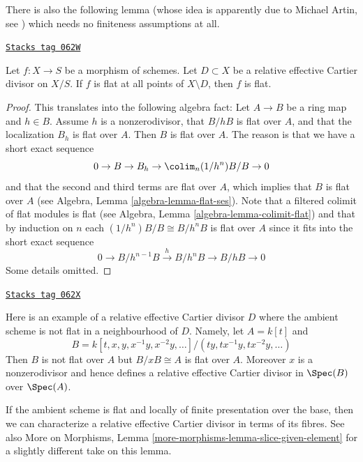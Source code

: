 There is also the following lemma (whose idea is apparently
due to Michael Artin, see \cite{Nobile}) which needs no finiteness
assumptions at all.

\begin{lemma}
\label{divisors-lemma-michael-artin}
\href{https://stacks.math.columbia.edu/tag/062W}{\texttt{Stacks tag 062W}}

Let $f : X \to S$ be a morphism of schemes.
Let $D \subset X$ be a relative effective Cartier divisor on $X/S$.
If $f$ is flat at all points of $X \setminus D$, then $f$ is flat.
\end{lemma}

\begin{proof}
This translates into the following algebra fact:
Let $A \to B$ be a ring map and $h \in B$.
Assume $h$ is a nonzerodivisor, that $B/hB$ is flat over $A$, and
that the localization $B_h$ is flat over $A$. Then $B$ is flat over $A$.
The reason is that we have a short exact sequence
$$
0 \to B \to B_h \to \colim_n (1/h^n)B/B \to 0
$$
and that the second and third terms are flat over $A$, which implies
that $B$ is flat over $A$ (see
Algebra, Lemma \ref{algebra-lemma-flat-ses}). Note that a filtered
colimit of flat modules is flat (see
Algebra, Lemma \ref{algebra-lemma-colimit-flat})
and that by induction on $n$ each $(1/h^n)B/B \cong B/h^nB$ is flat over
$A$ since it fits into the short exact sequence
$$
0 \to B/h^{n - 1}B \xrightarrow{h} B/h^nB \to B/hB \to 0
$$
Some details omitted.
\end{proof}

\begin{example}
\label{divisors-example-relative-cartier-ambient-space-not-flat}
\href{https://stacks.math.columbia.edu/tag/062X}{\texttt{Stacks tag 062X}}

Here is an example of a relative effective Cartier divisor $D$ where the
ambient scheme is not flat in a neighbourhood of $D$. Namely, let
$A = k[t]$ and
$$
B = k[t, x, y, x^{-1}y, x^{-2}y, \ldots]/(ty, tx^{-1}y, tx^{-2}y, \ldots)
$$
Then $B$ is not flat over $A$ but $B/xB \cong A$ is flat over $A$.
Moreover $x$ is a nonzerodivisor and hence defines a relative effective
Cartier divisor in $\Spec(B)$ over $\Spec(A)$.
\end{example}

If the ambient scheme is flat and locally of finite presentation over
the base, then we can characterize a relative effective Cartier divisor
in terms of its fibres. See also
More on Morphisms, Lemma \ref{more-morphisms-lemma-slice-given-element}
for a slightly different take on this lemma.

